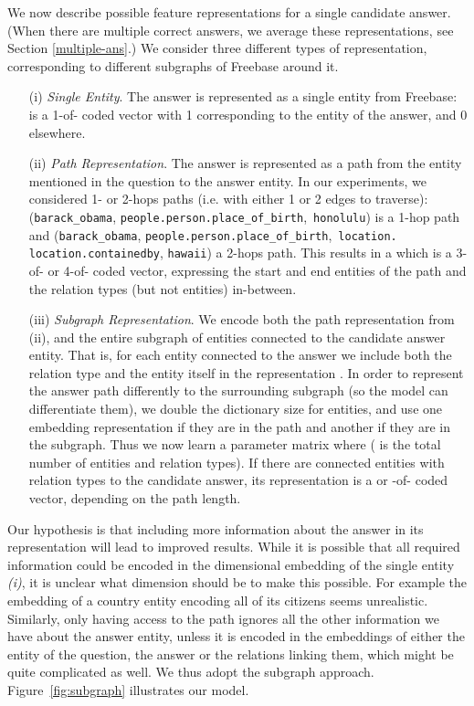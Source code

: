 \documentclass[runningheads,a4paper]{llncs}
\newcommand{\fb}{{\sc Freebase}\xspace}
\newcommand{\ent}[1]{{\small {\tt #1}}}
\begin{document}
We now describe possible feature representations for a single
candidate answer. (When there are multiple correct answers, we average these 
representations, see Section \ref{multiple-ans}.)
We consider three different types of representation,
corresponding to different subgraphs of \fb around
it.
\begin{itemize}
\item[(i)] {\it Single Entity}. The answer is represented 
as a single entity from \fb:
 is a 1-of- coded vector with 1 corresponding to the 
entity of the answer, and 0 elsewhere. 
\item[(ii)] {\it Path Representation}. The answer is represented as a
  path from the entity mentioned in the question to the answer
  entity.  In our experiments, we considered 1- or 2-hops paths
  (i.e. with either 1 or 2 edges to traverse):
(\ent{barack\_obama},
\ent{people.}\ent{person.}\ent{place\_of\_birth},~\ent{honolulu}) is a 1-hop path
and  (\ent{barack\_obama},
\ent{people.person.place\_of\_birth},~\ent{location.} \ent{location.containedby}, \ent{hawaii}) a 2-hops path.
This results in a  which is a 3-of- or 4-of- coded
  vector, expressing the start and end entities of the path and the
  relation types (but not entities) in-between.
\item[(iii)] {\it Subgraph Representation}. We encode both the path
  representation from (ii), and the entire subgraph of entities
  connected to the candidate answer entity. That is, for each entity
  connected to the answer we include both the relation type and the
  entity itself in the representation . In order to represent
  the answer path differently to the surrounding subgraph (so the
  model can differentiate them), we double the dictionary size for
  entities, and use one embedding representation if they are in the
  path and another if they are in the subgraph.  Thus we now learn a
  parameter matrix  where  ( is the total number of entities and relation
  types). If there are  connected entities with  relation types
  to the candidate answer, its representation is a  or
  -of- coded vector, depending on the path length.


\end{itemize}

\label{sec:hypo}

Our hypothesis is that including more information about the answer in
its representation will lead to improved results. While it is possible
that all required information could be encoded in the  dimensional
embedding of the single entity {\it (i)}, it is unclear what dimension
 should be to make this possible. For example the embedding
of a country entity encoding all of its citizens seems unrealistic.
Similarly, only having access to the path ignores all the other
information we have about the answer entity, unless it is encoded in
the embeddings of either the entity of the question, the answer or the
relations linking them, which might be quite complicated
as well.  We thus adopt the subgraph approach.
Figure~\ref{fig:subgraph} illustrates our model. 
\end{document}
